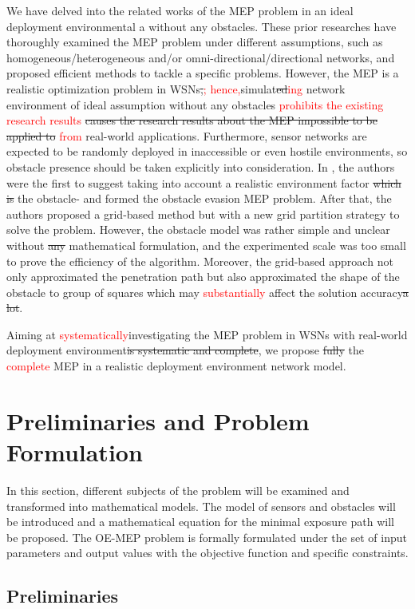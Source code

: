 \documentclass[final]{elsarticle}
\begin{document}
We have delved into the related works of the MEP problem in an ideal deployment environmental a without any obstacles. These prior researches have thoroughly examined the MEP problem under different assumptions, such as homogeneous/heterogeneous and/or omni-directional/directional networks, and proposed efficient methods to tackle a specific problems. However, the MEP is a realistic optimization problem in WSNs\sout{,}\textcolor{red}{;} \textcolor{red}{hence,}simulat\sout{ed}\textcolor{red}{ing} network environment of ideal assumption without any obstacles \textcolor{red}{prohibits the existing research results} \sout{causes the research results about the MEP impossible to be applied to} \textcolor{red}{from} real-world applications. Furthermore, sensor networks are expected to be randomly deployed in inaccessible or even hostile environments, so obstacle presence should be taken explicitly into consideration. In \cite{liu2017obstacle}, the authors were the first to suggest taking into account a realistic environment factor\sout{ which is} the obstacle- and formed the obstacle evasion MEP problem. After that, the authors proposed a grid-based method but with a new grid partition strategy to solve the problem. However, the obstacle model was rather simple and unclear without \sout{any} mathematical formulation, and the experimented scale was too small to prove the efficiency of the algorithm. Moreover, the grid-based approach not only approximated the penetration path but also approximated the shape of the obstacle to group of squares which may \textcolor{red}{substantially} affect the solution accuracy\sout{a lot}.

Aiming at \textcolor{red}{systematically}investigating the MEP problem in WSNs with real-world deployment environment\sout{is systematic and complete}, we propose \sout{fully} the \textcolor{red}{complete} MEP in a realistic deployment environment network model. 
\section{Preliminaries and Problem Formulation}
In this section, different subjects of the problem will be examined and transformed into mathematical models. The model of sensors and obstacles will be introduced and a mathematical equation for the minimal exposure path will be proposed. The OE-MEP problem is formally formulated under the set of input parameters and output values with the objective function and specific constraints.
\subsection{Preliminaries}
\end{document}
